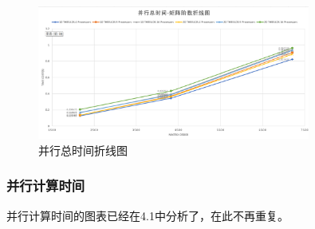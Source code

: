 \documentclass[UTF8]{article}
\begin{document}
    \begin{figure}[h]
        \label{Ratio}
        \centering
            \includegraphics[width=0.8\textwidth]{pal.png}
            \caption{并行总时间折线图}
        \end{figure}
\clearpage

\subsubsection{并行计算时间}
并行计算时间的图表已经在4.1中分析了，在此不再重复。
\end{document}
